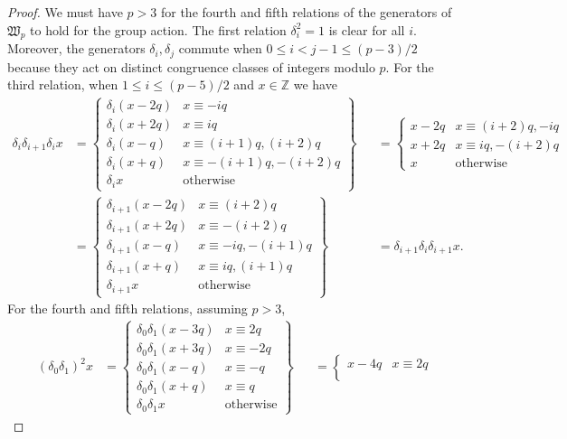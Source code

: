 \documentclass[ALCO, Unicode,published]{cedram}
\newcommand*\nicefrac[2]{#1/#2}
\begin{document}
\begin{proof}
We must have $p>3$ for the fourth and fifth relations of the generators of $\mathfrak{W}_p$ to hold for the group action. 
The first relation $\delta_i^2=1$ is clear for all $i$. Moreover, the generators $\delta_i,\delta_j$ commute when $0\leq i<j-1\leq \nicefrac{(p-3)}{2}$ because they act on distinct congruence classes of integers modulo $p$. For the third relation, when $1\leq i\leq\nicefrac{(p-5)}{2}$ and $x\in\mathbb{Z}$ we have 
\begin{align*}
\delta_i\delta_{i+1}\delta_ix&=\left\{\begin{array}{l|l}\delta_i(x-2q)&x\equiv-iq\\
\delta_i(x+2q)&x\equiv iq\\
\delta_i(x-q)&x\equiv(i+1)q,(i+2)q\\
\delta_i(x+q)&x\equiv-(i+1)q,-(i+2)q\\
\delta_ix&\text{otherwise}\end{array}\right\}&&=\left\{\begin{array}{l|l}x-2q&x\equiv(i+2)q,-iq\\
x+2q&x\equiv iq,-(i+2)q\\
x&\text{otherwise}\end{array}\right.\\
&=\left\{\begin{array}{l|l}\delta_{i+1}(x-2q)&x\equiv(i+2)q\\
\delta_{i+1}(x+2q)&x\equiv-(i+2)q\\
\delta_{i+1}(x-q)&x\equiv-iq,-(i+1)q\\
\delta_{i+1}(x+q)&x\equiv iq,(i+1)q\\
\delta_{i+1}x&\text{otherwise}\end{array}\right\}&&=\delta_{i+1}\delta_i\delta_{i+1}x.\end{align*}
For the fourth and fifth relations, assuming $p>3$, 
\begin{align*}(\delta_0\delta_1)^2x&=\left\{\begin{array}{l|l}\delta_0\delta_1(x-3q)&x\equiv2q\\
\delta_0\delta_1(x+3q)&x\equiv-2q\\
\delta_0\delta_1(x-q)&x\equiv-q\\
\delta_0\delta_1(x+q)&x\equiv q\\
\delta_0\delta_1x&\text{otherwise}\end{array}\right\}&&=\left\{\begin{array}{l|l}x-4q&x\equiv2q\\

\end{array}
\end{align*}
\end{proof}
\end{document}
